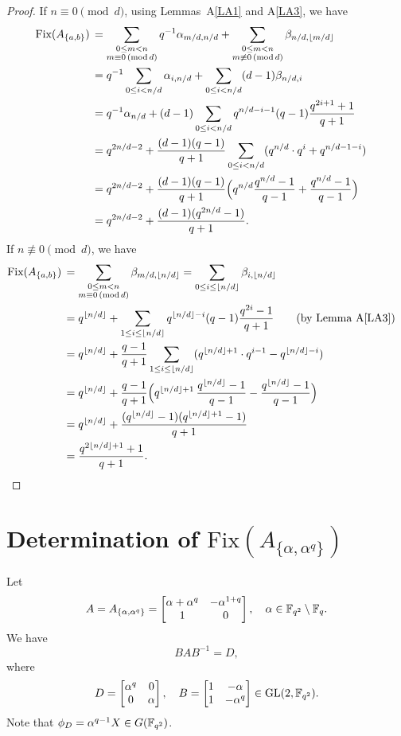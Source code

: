 \documentclass{amsart}
\numberwithin{equation}{section}
\theoremstyle{definition}
\newcommand{\f}{\Bbb F}
\begin{document}
\begin{proof}
If $n\equiv 0\pmod d$, using Lemmas~A\ref{LA1} and A\ref{LA3}, we have
\begin{align*}
\text{\rm Fix}(A_{\{a,b\}})\,&=\sum_{\substack{0\le m<n\cr m\equiv0\,(\text{mod}\,d)}}q^{-1}\alpha_{m/d,n/d}+\sum_{\substack{0\le m<n\cr m\not\equiv0\,(\text{mod}\,d)}}\beta_{n/d,\lfloor m/d\rfloor}\cr
&=q^{-1}\sum_{0\le i<n/d}\alpha_{i,n/d}+\sum_{0\le i<n/d}(d-1)\beta_{n/d,i}\cr
&=q^{-1}\alpha_{n/d}+(d-1)\sum_{0\le i<n/d}q^{n/d-i-1}(q-1)\frac{q^{2i+1}+1}{q+1}\cr
&=q^{2n/d-2}+\frac{(d-1)(q-1)}{q+1}\sum_{0\le i<n/d}(q^{n/d}\cdot q^i+q^{n/d-1-i})\cr
&=q^{2n/d-2}+\frac{(d-1)(q-1)}{q+1}\Bigl( q^{n/d}\frac{q^{n/d}-1}{q-1}+\frac{q^{n/d}-1}{q-1}\Bigr)\cr
&=q^{2n/d-2}+\frac{(d-1)(q^{2n/d}-1)}{q+1}.
\end{align*}
If $n\not\equiv 0\pmod d$, we have
\begin{align*}
\text{\rm Fix}(A_{\{a,b\}})\,&=\sum_{\substack{0\le m<n\cr m\equiv0\,(\text{mod}\,d)}}\beta_{m/d,\lfloor n/d\rfloor}=\sum_{0\le i\le\lfloor n/d\rfloor}\beta_{i,\lfloor n/d\rfloor}\cr
&=q^{\lfloor n/d\rfloor}+\sum_{1\le i\le\lfloor n/d\rfloor}q^{\lfloor n/d\rfloor-i}(q-1)\frac{q^{2i}-1}{q+1}\kern2em\text{(by Lemma~A\ref{LA3})}\cr
&=q^{\lfloor n/d\rfloor}+\frac{q-1}{q+1}\sum_{1\le i\le\lfloor n/d\rfloor}(q^{\lfloor n/d\rfloor+1}\cdot q^{i-1}-q^{\lfloor n/d\rfloor-i})\cr
&=q^{\lfloor n/d\rfloor}+\frac{q-1}{q+1}\Bigl(q^{\lfloor n/d\rfloor+1}\,\frac{q^{\lfloor n/d\rfloor}-1}{q-1}-\frac{q^{\lfloor n/d\rfloor}-1}{q-1}\Bigr)\cr
&=q^{\lfloor n/d\rfloor}+\frac{(q^{\lfloor n/d\rfloor}-1)(q^{\lfloor n/d\rfloor+1}-1)}{q+1}\cr
&=\frac{q^{2\lfloor n/d\rfloor+1}+1}{q+1}.
\end{align*}
\end{proof}


\section{Determination of $\text{Fix}(A_{\{\alpha,\alpha^q\}})$}

Let 
\[
A=A_{\{\alpha,\alpha^q\}}=\left[\begin{matrix}\alpha+\alpha^q&-\alpha^{1+q}\cr 1&0\end{matrix}\right],\quad \alpha\in\f_{q^2}\setminus\f_q.
\]
We have
\begin{equation}\label{2.1}
BAB^{-1}=D,
\end{equation}
where 
\[
D=\left[\begin{matrix}\alpha^q&0\cr 0&\alpha\end{matrix}\right],\quad B=\left[\begin{matrix}1&-\alpha\cr 1&-\alpha^q\end{matrix}\right]\in\text{GL}(2,\f_{q^2}).
\]
Note that $\phi_D=\alpha^{q-1}X\in G(\f_{q^2})$.
\end{document}
